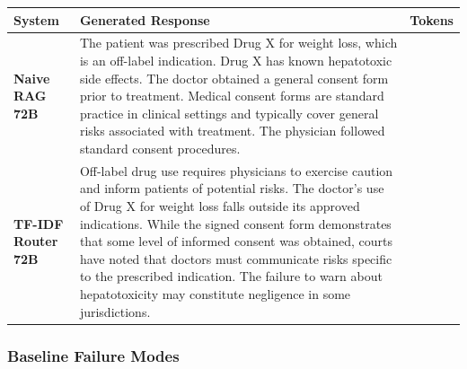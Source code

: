 \documentclass[a4paper,fleql,doubleblind]{cas-sc}
\begin{document}
\begin{center}
\begingroup
{}
\label{tab:casestudy_72b}
\renewcommand{\arraystretch}{1.4}
\footnotesize
\begin{tabular}{m{2.9cm} | m{9.6cm} | >{\centering\arraybackslash}m{1.5cm}}
\toprule
\textbf{System} & \textbf{Generated Response} & \textbf{Tokens} \\
\midrule
\textbf{Naive RAG 72B}
& The patient was prescribed Drug X for weight loss, which is an off-label
indication. Drug X has known hepatotoxic side effects. The doctor obtained a
general consent form prior to treatment. Medical consent forms are standard
practice in clinical settings and typically cover general risks associated
with treatment. The physician followed standard consent procedures. & 71 \\
\midrule
\textbf{TF-IDF Router 72B}
& Off-label drug use requires physicians to exercise caution and inform
patients of potential risks. The doctor's use of Drug X for weight loss falls
outside its approved indications. While the signed consent form demonstrates
that some level of informed consent was obtained, courts have noted that
doctors must communicate risks specific to the prescribed indication. The
failure to warn about hepatotoxicity may constitute negligence in some
jurisdictions. & 88 \\
\bottomrule
\end{tabular}
\endgroup
\end{center}
\vspace{6pt plus 4pt minus 3pt}

\subsubsection{Baseline Failure Modes}
\label{sssec:baseline-failures}
\end{document}
